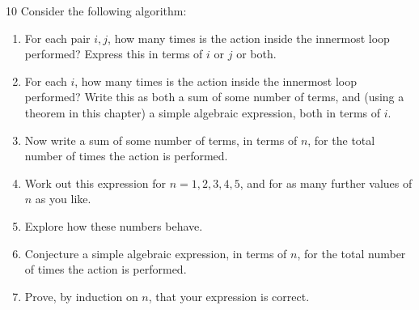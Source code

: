 \documentclass[11pt]{article}
\begin{document}
\FloatBarrier
\begin{exercise}{10}
    Consider the following algorithm:

    \begin{algorithm}[H]
        \DontPrintSemicolon
        \caption{Triple-loop counting}
    \end{algorithm}
    \begin{enumerate}[label=(\alph*)]
        \item For each pair $i,j$, how many times is the action
            inside the innermost loop performed? Express this in
            terms of $i$ or $j$ or both.
        \item For each $i$, how many times is the action inside the
            innermost loop performed? Write this as both a sum of
            some number of terms, and (using a theorem in this
            chapter) a simple algebraic expression, both in terms of
            $i$.
        \item Now write a sum of some number of terms, in terms of
            $n$, for the total number of times the action is
            performed.
        \item Work out this expression for $n = 1,2,3,4,5$, and for as
            many further values of $n$ as you like.
        \item Explore how these numbers behave.
        \item Conjecture a simple algebraic expression, in terms of
            $n$, for the total number of times the action is
            performed.
        \item Prove, by induction on $n$, that your expression is
            correct.
    \end{enumerate}
\end{exercise}
\end{document}
